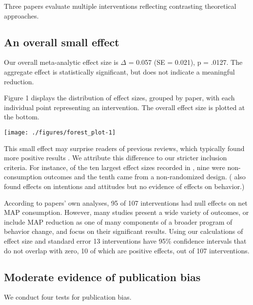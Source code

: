 \documentclass[sn-nature,pdflatex]{sn-jnl}
\begin{document}
Three papers \citep{piester2020, hennessy2016, kanchanachitra2020}
evaluate multiple interventions reflecting contrasting theoretical
approaches.

\subsection{An overall small effect}\label{sec2.2}

Our overall meta-analytic effect size is \(\Delta\) = 0.057 (SE =
0.021), p = .0127. The aggregate effect is statistically significant,
but does not indicate a meaningful reduction.

Figure 1 displays the distribution of effect sizes, grouped by paper,
with each individual point representing an intervention. The overall
effect size is plotted at the bottom.

\texttt{[image: ./figures/forest\_plot-1]}

This small effect may surprise readers of previous reviews, which
typically found more positive results
\citep{mathur2021meta, meier2022, chang2023}. We attribute this
difference to our stricter inclusion criteria. For instance, of the ten
largest effect sizes recorded in \citep{mathur2021effectiveness}, nine
were non-consumption outcomes and the tenth came from a non-randomized
design. (\citep{bianchi2018conscious} also found effects on intentions
and attitudes but no evidence of effects on behavior.)

According to papers' own analyses, 95 of 107 interventions had null
effects on net MAP consumption. However, many studies present a wide
variety of outcomes, or include MAP reduction as one of many components
of a broader program of behavior change, and focus on their significant
results. Using our calculations of effect size and standard error 13
interventions have 95\% confidence intervals that do not overlap with
zero, 10 of which are positive effects, out of 107 interventions.

\subsection{Moderate evidence of publication bias}\label{sec2.3}

We conduct four tests for publication bias.

\begin{comment} 
introductory remarks about how this puts our main results in one light or another? 
\end{comment}
\end{document}
